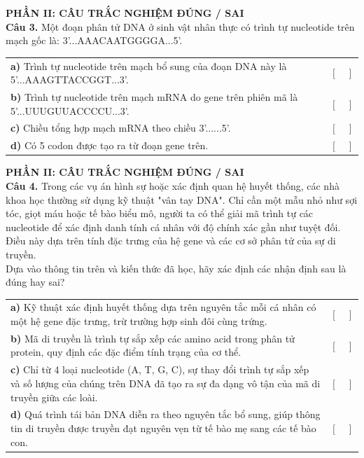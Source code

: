 \documentclass{article}
\begin{document}
\begin{minipage}[t][14.4cm][t]{\linewidth}
\fontsize{25}{33}\selectfont
{\color{brandGreen}\textbf{PHẦN II: CÂU TRẮC NGHIỆM ĐÚNG / SAI}\\[8pt]}
\textbf{Câu 3.} Một đoạn phân tử DNA ở sinh vật nhân thực có trình tự nucleotide trên mạch gốc là: 3'...AAACAATGGGGA...5'.
\vspace{8pt}

\begin{tabularx}{\linewidth}{@{}X r@{}}

\textbf{a) } Trình tự nucleotide trên mạch bổ sung của đoạn DNA này là 5'...AAAGTTACCGGT...3'. & $[\quad]$\\[8pt]
\textbf{b) } Trình tự nucleotide trên mạch mRNA do gene trên phiên mã là 5'...UUUGUUACCCCU...3'. & $[\quad]$\\[8pt]
\textbf{c) } Chiều tổng hợp mạch mRNA theo chiều 3'......5'. & $[\quad]$\\[8pt]
\textbf{d) } Có 5 codon được tạo ra từ đoạn gene trên. & $[\quad]$\\[8pt]
\end{tabularx}
\vfill
\end{minipage}
\newpage


\begin{minipage}[t][14.4cm][t]{\linewidth}
\fontsize{19}{25}\selectfont
{\color{brandGreen}\textbf{PHẦN II: CÂU TRẮC NGHIỆM ĐÚNG / SAI}\\[8pt]}
\textbf{Câu 4.} Trong các vụ án hình sự hoặc xác định quan hệ huyết thống, các nhà khoa học thường sử dụng kỹ thuật "vân tay DNA". Chỉ cần một mẫu nhỏ như sợi tóc, giọt máu hoặc tế bào biểu mô, người ta có thể giải mã trình tự các nucleotide để xác định danh tính cá nhân với độ chính xác gần như tuyệt đối. Điều này dựa trên tính đặc trưng của hệ gene và các cơ sở phân tử của sự di truyền.\\[4pt]Dựa vào thông tin trên và kiến thức đã học, hãy xác định các nhận định sau là đúng hay sai?
\vspace{8pt}

\begin{tabularx}{\linewidth}{@{}X r@{}}

\textbf{a) } Kỹ thuật xác định huyết thống dựa trên nguyên tắc mỗi cá nhân có một hệ gene đặc trưng, trừ trường hợp sinh đôi cùng trứng. & $[\quad]$\\[8pt]
\textbf{b) } Mã di truyền là trình tự sắp xếp các amino acid trong phân tử protein, quy định các đặc điểm tính trạng của cơ thể. & $[\quad]$\\[8pt]
\textbf{c) } Chỉ từ 4 loại nucleotide (A, T, G, C), sự thay đổi trình tự sắp xếp và số lượng của chúng trên DNA đã tạo ra sự đa dạng vô tận của mã di truyền giữa các loài. & $[\quad]$\\[8pt]
\textbf{d) } Quá trình tái bản DNA diễn ra theo nguyên tắc bổ sung, giúp thông tin di truyền được truyền đạt nguyên vẹn từ tế bào mẹ sang các tế bào con. & $[\quad]$\\[8pt]
\end{tabularx}
\vfill
\end{minipage}
\newpage
\end{document}
